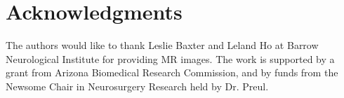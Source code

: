 \documentclass{aims}
\numberwithin{equation}{section}
\begin{document}

\section*{Acknowledgments}
The authors would like to thank Leslie Baxter and Leland Ho at Barrow
Neurological Institute for providing MR images. The work is supported
by a grant from Arizona Biomedical Research Commission, and by funds from the Newsome Chair in Neurosurgery Research held by Dr. Preul. \\

\end{document}

